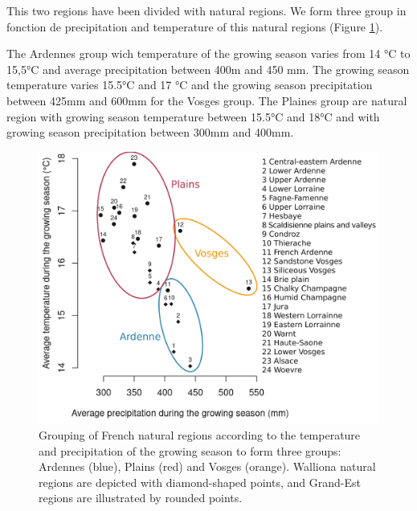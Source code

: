 \documentclass[3p,procedia]{elsarticle}
\begin{document}
This two  regions have been divided with natural regions. We form three group in fonction de precipitation and temperature of this natural regions (Figure \ref{fig:clim}).

The Ardennes group wich temperature of the growing season varies from 14 °C to 15,5°C and average precipitation between 400m and 450 mm. 
The growing season  temperature varies 15.5°C and 17 °C and the growing season  precipitation between 425mm and 600mm for the Vosges group.
The Plaines group are natural region with  growing season  temperature between 15.5°C and 18°C and with growing season  precipitation between 300mm and 400mm.

 

\begin{figure}
	\centering
\includegraphics[width=\textwidth]{climat/climat_region.png}
\caption{Grouping of French natural regions according to the temperature and precipitation of the growing season to form three groups: Ardennes (blue), Plains (red) and Vosges (orange). Walliona natural regions are depicted with diamond-shaped points, and Grand-Est regions are illustrated by rounded points.}
	\label{fig:clim}
\end{figure}

\end{document}
